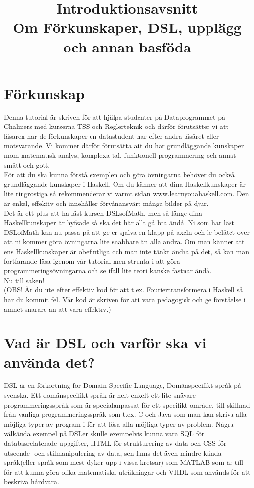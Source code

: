\documentclass{article}
\title{Introduktionsavsnitt\\
\large Om Förkunskaper, DSL, upplägg och annan basföda}
\author{}
\date{}
\begin{document}
\maketitle

\section{Förkunskap}

Denna tutorial är skriven för att hjälpa studenter på Dataprogrammet på Chalmers med kurserna TSS och Reglerteknik och därför förutsätter vi att läsaren har de förkunskaper en datastudent har efter andra läsåret eller motsvarande. Vi kommer därför förutsätta att du har grundläggande kunskaper inom matematisk analys, komplexa tal, funktionell programmering och annat smått och gott. \\

För att du ska kunna förstå exemplen och göra övningarna behöver du också grundläggande kunskaper i Haskell. Om du känner att dina Haskellkunskaper är lite ringrostiga så rekommenderar vi varmt sidan \url{www.learnyouahaskell.com}. Den är enkel, effektiv och innehåller förvånansvärt många bilder på djur. \\

Det är ett plus att ha läst kursen DSLsofMath, men så länge dina Haskellkunskaper är hyfsade så ska det här allt gå bra ändå. Ni som har läst DSLofMath kan nu passa på att ge er själva en klapp på axeln och le belåtet över att ni kommer göra övningarna lite snabbare än alla andra. Om man känner att ens Haskellkunskaper är obefintliga och man inte tänkt ändra på det, så kan man fortfarande läsa igenom vår tutorial men strunta i att göra programmeringsövningarna och se ifall lite teori kanske fastnar ändå.\\


Nu till saken!\\

(OBS! Är du ute efter effektiv kod för att t.ex. Fouriertransformera i Haskell så har du kommit fel. Vår kod är skriven för att vara pedagogisk och ge förståelse i ämnet snarare än att vara effektiv.)

\section{Vad är DSL och varför ska vi använda det?}

DSL är en förkortning för Domain Specific Language, Domänspecifikt språk på svenska. Ett domänspecifikt språk är helt enkelt ett lite snävare programmeringsspråk som är specialanpassat för ett specifikt område, till skillnad från vanliga programmeringsspråk som t.ex. C och Java som man kan skriva alla möjliga typer av program i för att lösa alla möjliga typer av problem. Några välkända exempel på DSLer skulle exempelvis kunna vara SQL för databasrelaterade uppgifter, HTML för strukturering av data och CSS för utseende- och stilmanipulering av data, sen finns det även mindre kända språk(eller språk som mest dyker upp i vissa kretsar) som MATLAB som är till för att kunna göra olika matematiska uträkningar och VHDL som används för att beskriva hårdvara.\\
\end{document}
